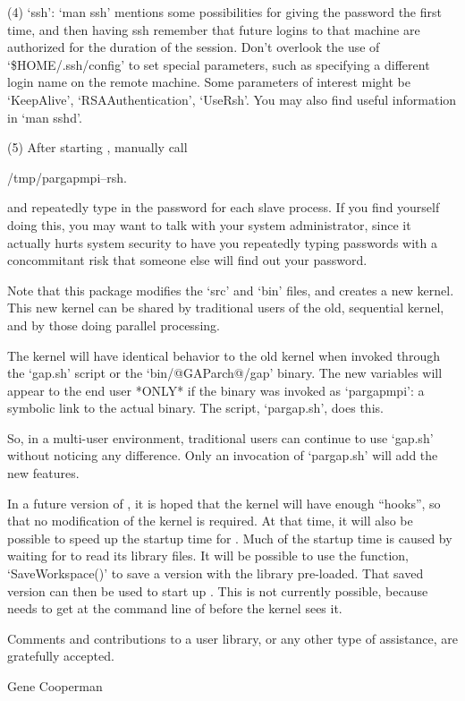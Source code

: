 \item{(4)}
    `ssh': `man ssh' mentions some possibilities for giving the  password
    the first time, and then having ssh remember that  future  logins  to
    that machine are authorized for the duration of  the  session.  Don't
    overlook the use of `\$HOME/.ssh/config' to set  special  parameters,
    such as specifying a different login name on the remote machine. Some
    parameters of interest  might  be  `KeepAlive',  `RSAAuthentication',
    `UseRsh'. You may also find useful information in `man sshd'.

\item{(5)}
     After starting {\ParGAP}, manually call

\begintt
/tmp/pargapmpi--rsh.$$
\endtt

\item{}
    and repeatedly type in the password for each slave  process.  If  you
    find yourself doing this, you may  want  to  talk  with  your  system
    administrator, since it actually hurts system security  to  have  you
    repeatedly typing passwords with a  concommitant  risk  that  someone
    else will find out your password.

\endlist


Note that this package modifies the {\GAP} `src'  and  `bin'  files,  and
creates a new {\GAP} kernel. This new {\GAP}  kernel  can  be  shared  by
traditional users of the old, sequential  {\GAP}  kernel,  and  by  those
doing parallel processing.

The {\GAP} kernel will have identical behavior to the old  {\GAP}  kernel
when invoked through  the  `gap.sh'  script  or  the  `bin/@GAParch@/gap'
binary. The new {\ParGAP} variables will appear to the end user *ONLY* if
the {\GAP} binary was invoked as `pargapmpi':  a  symbolic  link  to  the
actual {\GAP} binary. The script, `pargap.sh', does this.

So, in a multi-user environment, traditional users can  continue  to  use
`gap.sh'  without  noticing  any  difference.  Only  an   invocation   of
`pargap.sh' will add the new features.

In a future version of {\GAP}, it is hoped that the  {\GAP}  kernel  will
have enough ``hooks'', so that no modification of the  {\GAP}  kernel  is
required. At that time, it will also be possible to speed up the  startup
time for {\ParGAP}. Much of the startup time is  caused  by  waiting  for
{\GAP} to read its library files. It will be possible to use  the  {\GAP}
function, `SaveWorkspace()' to save a version  with  the  {\GAP}  library
pre-loaded. That saved version can then be used to  start  up  {\ParGAP}.
This is not currently possible, because {\ParGAP} needs  to  get  at  the
command line of {\GAP} before the {\GAP} kernel sees it.

Comments and contributions to a {\ParGAP} user library, or any other type
of assistance, are gratefully accepted.


Gene Cooperman

